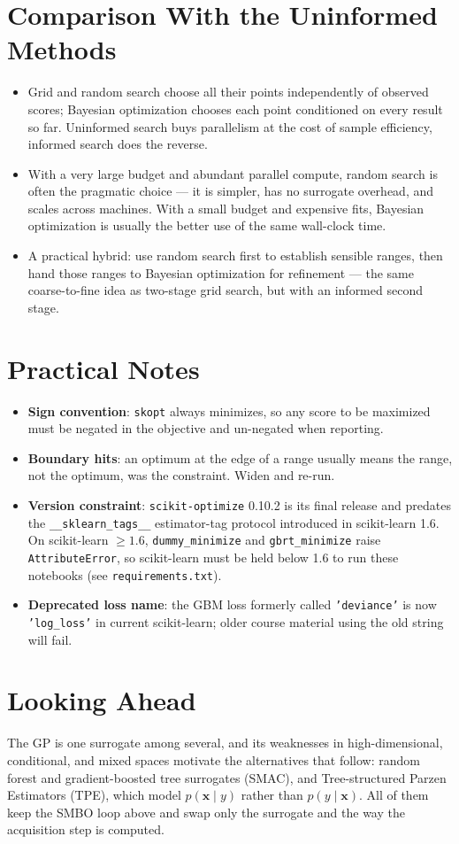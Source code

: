 \documentclass[conference]{IEEEtran}
\begin{document}
\section*{Comparison With the Uninformed Methods}
\begin{itemize}
    \item Grid and random search choose all their points independently of observed scores; Bayesian optimization chooses each point conditioned on every result so far. Uninformed search buys parallelism at the cost of sample efficiency, informed search does the reverse.
    \item With a very large budget and abundant parallel compute, random search is often the pragmatic choice --- it is simpler, has no surrogate overhead, and scales across machines. With a small budget and expensive fits, Bayesian optimization is usually the better use of the same wall-clock time.
    \item A practical hybrid: use random search first to establish sensible ranges, then hand those ranges to Bayesian optimization for refinement --- the same coarse-to-fine idea as two-stage grid search, but with an informed second stage.
\end{itemize}

\section*{Practical Notes}
\begin{itemize}
    \item \textbf{Sign convention}: \texttt{skopt} always minimizes, so any score to be maximized must be negated in the objective and un-negated when reporting.
    \item \textbf{Boundary hits}: an optimum at the edge of a range usually means the range, not the optimum, was the constraint. Widen and re-run.
    \item \textbf{Version constraint}: \texttt{scikit-optimize} 0.10.2 is its final release and predates the \texttt{\_\_sklearn\_tags\_\_} estimator-tag protocol introduced in scikit-learn 1.6. On scikit-learn $\geq 1.6$, \texttt{dummy\_minimize} and \texttt{gbrt\_minimize} raise \texttt{AttributeError}, so scikit-learn must be held below 1.6 to run these notebooks (see \texttt{requirements.txt}).
    \item \textbf{Deprecated loss name}: the GBM loss formerly called \texttt{'deviance'} is now \texttt{'log\_loss'} in current scikit-learn; older course material using the old string will fail.
\end{itemize}

\section*{Looking Ahead}
The GP is one surrogate among several, and its weaknesses in high-dimensional, conditional, and mixed spaces motivate the alternatives that follow: random forest and gradient-boosted tree surrogates (SMAC), and Tree-structured Parzen Estimators (TPE), which model $p(\mathbf{x} \mid y)$ rather than $p(y \mid \mathbf{x})$. All of them keep the SMBO loop above and swap only the surrogate and the way the acquisition step is computed.
\end{document}
